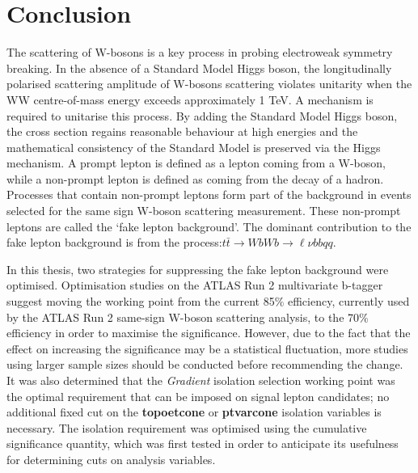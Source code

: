 \chapter{Conclusion}
The scattering of W-bosons is a key process in probing electroweak symmetry breaking. In the absence of a Standard Model Higgs boson, the longitudinally polarised scattering amplitude of W-bosons scattering violates unitarity when the WW centre-of-mass energy exceeds approximately 1 TeV. A mechanism is required to unitarise this process. By adding the Standard Model Higgs boson, the cross section regains reasonable behaviour at high energies and the mathematical consistency of the Standard Model is preserved via the Higgs mechanism. A prompt lepton is defined as a lepton coming from a W-boson, while a non-prompt lepton is defined as coming from the decay of a hadron. Processes that contain non-prompt leptons form part of the background in events selected for the same sign W-boson scattering measurement. These non-prompt leptons are called the `fake lepton background'. The dominant contribution to the fake lepton background is from the process:$t\bar{t} \longrightarrow WbWb \longrightarrow \ell \nu  bb qq$.

In this thesis, two strategies for suppressing the fake lepton background were optimised. Optimisation studies on the ATLAS Run 2 multivariate b-tagger suggest moving the working point from the current 85$\%$ efficiency, currently used by the ATLAS Run 2 same-sign W-boson scattering analysis, to the 70$\%$ efficiency in order to maximise the significance. However, due to the fact that the effect on increasing the significance may be a statistical fluctuation, more studies using larger sample sizes should be conducted before recommending the change.  It was also determined that the \textit{Gradient} isolation selection working point was the optimal requirement that can be imposed on signal lepton candidates; no additional fixed cut on the \textbf{topoetcone} or \textbf{ptvarcone} isolation variables is necessary. The isolation requirement was optimised using the cumulative significance quantity, which was first tested in order to anticipate its usefulness for determining cuts on analysis variables.


